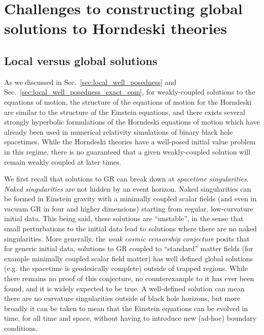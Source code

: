 \documentclass{ws-ijmpd}
\begin{document}
\section{Challenges to constructing global solutions to
   Horndeski theories
   \label{sec:failure_global}
}
\subsection{Local versus global solutions\label{sec:local_vs_global_solutions}}
As we discussed in
Sec.~\ref{sec:local_well_posedness} and 
Sec.~\ref{sec:local_well_posedness_exact_eom},
for weakly-coupled solutions to the equations of motion, 
the structure of the equations of motion for the Horndeski 
are similar to the structure of the Einstein equations,
and there exists several strongly hyperbolic
formulations of the Horndeski equations of motion which have already
been used in numerical relativity simulations of binary black hole
spacetimes\cite{East:2020hgw,Figueras:2021abd,East:2021bqk}.
While the Horndeski theories have a well-posed initial 
value problem in this regime, there is no guaranteed that a given
weakly-coupled solution will remain weakly coupled at later times.

We first recall that solutions to GR can break down at 
\emph{spacetime singularities}\cite{hawking_ellis_1973}.
\emph{Naked singularities} are not hidden by an event horizon.
Naked singularities can be formed in Einstein gravity
with a minimally coupled scalar
fields\cite{10.2307/2118619}
(and even in vacuum GR in four and higher\cite{Zhang:2015rsa} dimensions)
starting from regular, low-curvature initial data.
This being said, 
these solutions are ``unstable''\cite{christodoulou1999instability},
in the sense that small perturbations to the initial data lead to solutions
where there are no naked singularities.
More generally, the 
\emph{weak cosmic censorship conjecture}\cite{1969NCimR...1..252P}
posits that for generic initial data,
solutions to GR coupled to ``standard'' matter fields (for example 
minimally coupled scalar field matter) has well defined global
solutions (e.g. the spacetime is geodesically complete)
outside of trapped regions.
While there remains no proof of this conjecture, no counterexample to it
has ever been found, and it is widely expected to be true\cite{Wald:1997wa}.
A well-defined solution can mean there are no curvature singularities outside
of black hole horizons, 
but more broadly it can be taken to
mean that the Einstein equations can be evolved in time,
for all time and space, without having to introduce new (ad-hoc)
boundary conditions.
\end{document}
